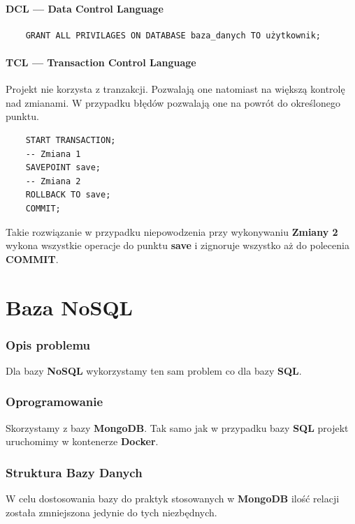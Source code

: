 \documentclass[a4paper,11pt]{article}
\begin{document}
\subsection*{DCL --- Data Control Language}
\begin{verbatim}
    GRANT ALL PRIVILAGES ON DATABASE baza_danych TO użytkownik;
\end{verbatim}

\subsection*{TCL --- Transaction Control Language}
Projekt nie korzysta z tranzakcji. Pozwalają one natomiast na większą kontrolę nad zmianami.
W przypadku błędów pozwalają one na powrót do określonego punktu.
\begin{verbatim}
    START TRANSACTION;
    -- Zmiana 1
    SAVEPOINT save;
    -- Zmiana 2
    ROLLBACK TO save;
    COMMIT;
\end{verbatim}
Takie rozwiązanie w przypadku niepowodzenia przy wykonywaniu \textbf{Zmiany 2}
wykona wszystkie operacje do punktu \textbf{save} i zignoruje wszystko aż do polecenia \textbf{COMMIT}.

\pagebreak
\part{Baza NoSQL}
\section*{Opis problemu}
Dla bazy \textbf{NoSQL} wykorzystamy ten sam problem co dla bazy \textbf{SQL}.

\section*{Oprogramowanie}
Skorzystamy z bazy \textbf{MongoDB}. Tak samo jak w przypadku bazy \textbf{SQL} projekt uruchomimy w kontenerze \textbf{Docker}.

\section*{Struktura Bazy Danych}
W celu dostosowania bazy do praktyk stosowanych w \textbf{MongoDB} ilość relacji została zmniejszona jedynie do tych niezbędnych.
\end{document}
